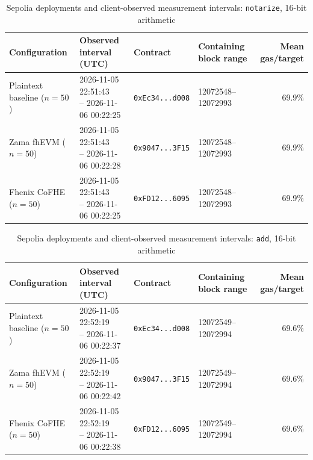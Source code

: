 \begin{table}[!t]
\caption{Sepolia deployments and client-observed measurement intervals: \texttt{notarize}, 16-bit arithmetic}
\label{tab:sepolia-client-intervals-classic-euint16-notarize}
\centering
\footnotesize
\setlength{\tabcolsep}{4pt}
\begin{tabular}{|l|l|l|l|r|}
\hline
\textbf{Configuration} &
\textbf{Observed interval (UTC)} &
\textbf{Contract} &
\textbf{Containing block range} &
\textbf{Mean gas/target} \\
\hline
Plaintext baseline (\(n=50\)) &
\shortstack[l]{2026-11-05 22:51:43 \\ -- 2026-11-06 00:22:25} &
\texttt{0xEc34...d008} &
12072548--12072993 &
69.9\% \\
\hline
Zama fhEVM (\(n=50\)) &
\shortstack[l]{2026-11-05 22:51:43 \\ -- 2026-11-06 00:22:28} &
\texttt{0x9047...3F15} &
12072548--12072993 &
69.9\% \\
\hline
Fhenix CoFHE (\(n=50\)) &
\shortstack[l]{2026-11-05 22:51:43 \\ -- 2026-11-06 00:22:25} &
\texttt{0xFD12...6095} &
12072548--12072993 &
69.9\% \\
\hline
\end{tabular}
\end{table}

\begin{table}[!t]
\caption{Sepolia deployments and client-observed measurement intervals: \texttt{add}, 16-bit arithmetic}
\label{tab:sepolia-client-intervals-classic-euint16-add}
\centering
\footnotesize
\setlength{\tabcolsep}{4pt}
\begin{tabular}{|l|l|l|l|r|}
\hline
\textbf{Configuration} &
\textbf{Observed interval (UTC)} &
\textbf{Contract} &
\textbf{Containing block range} &
\textbf{Mean gas/target} \\
\hline
Plaintext baseline (\(n=50\)) &
\shortstack[l]{2026-11-05 22:52:19 \\ -- 2026-11-06 00:22:37} &
\texttt{0xEc34...d008} &
12072549--12072994 &
69.6\% \\
\hline
Zama fhEVM (\(n=50\)) &
\shortstack[l]{2026-11-05 22:52:19 \\ -- 2026-11-06 00:22:42} &
\texttt{0x9047...3F15} &
12072549--12072994 &
69.6\% \\
\hline
Fhenix CoFHE (\(n=50\)) &
\shortstack[l]{2026-11-05 22:52:19 \\ -- 2026-11-06 00:22:38} &
\texttt{0xFD12...6095} &
12072549--12072994 &
69.6\% \\
\hline
\end{tabular}
\end{table}

